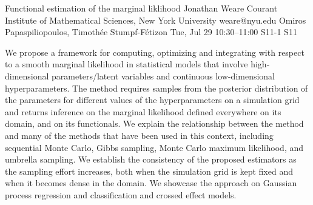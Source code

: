 \begin{talk}
  {Functional estimation of the marginal liklihood}%
  {Jonathan Weare}%
  {Courant Institute of Mathematical Sciences, New York University}%
  {weare@nyu.edu}%
  {Omiros Papaspiliopoulos, Timoth\'ee Stumpf-F\'etizon}%
  {}%
  {Tue, Jul 29 10:30–11:00}%
  {S11-1}%
  {S11}%
  
				
			
We propose a framework for computing, optimizing and integrating with respect to
a smooth marginal likelihood in statistical models that involve high-dimensional parameters/latent
variables and continuous low-dimensional hyperparameters. The method requires samples from
the posterior distribution of the parameters for different values of the hyperparameters on a simulation grid and returns inference on the marginal likelihood defined everywhere on its domain,
and on its functionals. We explain the relationship between the method and many of the methods that have been
used in this context, including sequential Monte Carlo, Gibbs sampling, Monte Carlo maximum
likelihood, and umbrella sampling. We establish the consistency of the proposed estimators as
the sampling effort increases, both when the simulation grid is kept fixed and when it becomes
dense in the domain. We showcase the approach on Gaussian process regression and classification and crossed effect models.


\end{talk}

